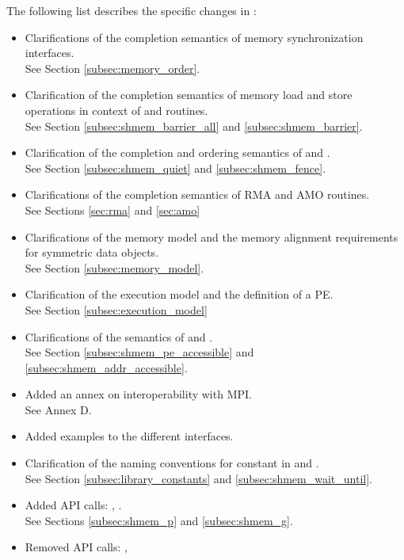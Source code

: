 The following list describes the specific changes in \openshmem[1.1]:
\begin{itemize}
%
\item Clarifications of the completion semantics of memory synchronization
      interfaces.
\\See Section \ref{subsec:memory_order}.
%
\item Clarification of the completion semantics of memory load and store
      operations in context of  and 
      routines.
\\See Section \ref{subsec:shmem_barrier_all} and \ref{subsec:shmem_barrier}.
%
\item Clarification of the completion and ordering semantics of
       and .
\\See Section \ref{subsec:shmem_quiet} and \ref{subsec:shmem_fence}.
%
\item Clarifications of the completion semantics of \ac{RMA} and \ac{AMO}
      routines.
\\See Sections \ref{sec:rma} and \ref{sec:amo}
%
\item Clarifications of the memory model and the memory alignment requirements
      for symmetric data objects.
\\See Section \ref{subsec:memory_model}.
%
\item Clarification of the execution model and the definition of a \ac{PE}.
\\See Section \ref{subsec:execution_model}
%
\item Clarifications of the semantics of  and
      .
\\See Section \ref{subsec:shmem_pe_accessible} and \ref{subsec:shmem_addr_accessible}.
%
\item Added an annex on interoperability with \ac{MPI}.
\\See Annex D.
%
\item Added examples to the different interfaces.
%
\item Clarification of the naming conventions for constant in \Cstd and
      \Fortran.
\\See Section \ref{subsec:library_constants} and \ref{subsec:shmem_wait_until}.
%
\item Added \ac{API} calls: , .
\\See Sections \ref{subsec:shmem_p} and \ref{subsec:shmem_g}.
%
\item Removed \ac{API} calls: ,

\end{itemize}
